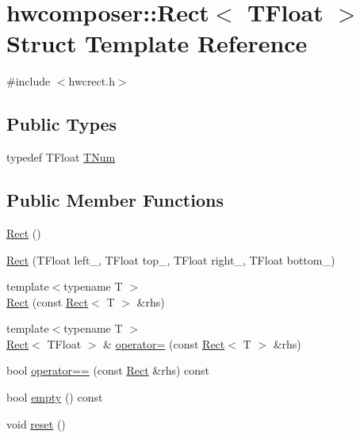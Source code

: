 \hypertarget{structhwcomposer_1_1Rect}{}\section{hwcomposer\+:\+:Rect$<$ T\+Float $>$ Struct Template Reference}
\label{structhwcomposer_1_1Rect}


{\ttfamily \#include $<$hwcrect.\+h$>$}

\subsection*{Public Types}
\begin{DoxyCompactItemize}
\item 
typedef T\+Float \mbox{\hyperlink{structhwcomposer_1_1Rect_a2213394736c5d22a67a543d8aba355e6}{T\+Num}}
\end{DoxyCompactItemize}
\subsection*{Public Member Functions}
\begin{DoxyCompactItemize}
\item 
\mbox{\hyperlink{structhwcomposer_1_1Rect_adbce36e618da93c3c776d1032b5e16fe}{Rect}} ()
\item 
\mbox{\hyperlink{structhwcomposer_1_1Rect_ad7670c06999770001be36a8160642849}{Rect}} (T\+Float left\+\_\+, T\+Float top\+\_\+, T\+Float right\+\_\+, T\+Float bottom\+\_\+)
\item 
{\footnotesize template$<$typename T $>$ }\\\mbox{\hyperlink{structhwcomposer_1_1Rect_a0cf8a9ffd29d165ff0b800f4a7f6fecb}{Rect}} (const \mbox{\hyperlink{structhwcomposer_1_1Rect}{Rect}}$<$ T $>$ \&rhs)
\item 
{\footnotesize template$<$typename T $>$ }\\\mbox{\hyperlink{structhwcomposer_1_1Rect}{Rect}}$<$ T\+Float $>$ \& \mbox{\hyperlink{structhwcomposer_1_1Rect_a2a0639148f54cae322649c063a7119d4}{operator=}} (const \mbox{\hyperlink{structhwcomposer_1_1Rect}{Rect}}$<$ T $>$ \&rhs)
\item 
bool \mbox{\hyperlink{structhwcomposer_1_1Rect_a7c600a50d058b86fb3984bf1f0ce57c3}{operator==}} (const \mbox{\hyperlink{structhwcomposer_1_1Rect}{Rect}} \&rhs) const
\item 
bool \mbox{\hyperlink{structhwcomposer_1_1Rect_a2a8a89f0070ee6ee8366a6631ab26161}{empty}} () const
\item 
void \mbox{\hyperlink{structhwcomposer_1_1Rect_a63dbe81fe15740d640c56bef243386ef}{reset}} ()
\end{DoxyCompactItemize}
